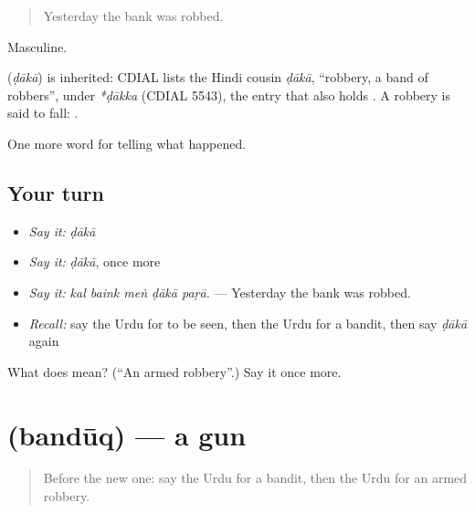 \begin{quote}
Yesterday the bank was robbed.
\end{quote}

Masculine.

\begin{cousinweb}
\textbf{} (\emph{ḍākā}) is inherited: CDIAL lists the Hindi cousin \emph{ḍākā}, \textquotedblleft{}robbery, a band of robbers\textquotedblright{}, under \emph{*ḍākka} (CDIAL 5543), the entry that also holds \textbf{}. A robbery is said to fall: \textbf{ }.
\end{cousinweb}

\begin{grammarlens}[title={What you've built}]
One more word for telling what happened.
\end{grammarlens}

\subsection*{Your turn}
\begin{itemize}
\raggedright
  \item \emph{Say it:} \emph{ḍākā}
  \item \emph{Say it:} \emph{ḍākā}, once more
  \item \emph{Say it:} \emph{kal baink meṅ ḍākā paṛā.} — Yesterday the bank was robbed.
  \item \emph{Recall:} say the Urdu for to be seen, then the Urdu for a bandit, then say \emph{ḍākā} again
\end{itemize}

\begin{tcolorbox}[breakable,colback=teal!4,colframe=teal!35!black,title={Before you move on}]
What does  mean? (\textquotedblleft{}An armed robbery\textquotedblright{}.) Say it once more.
\end{tcolorbox}
\section[\texorpdfstring{\ur{بندوق} (bandūq)}{بندوق (bandūq)}]{ (bandūq) — a gun}

\label{lesson:UR-C280-banduq}



\begin{quote}
Before the new one: say the Urdu for a bandit, then the Urdu for an armed robbery.
\end{quote}

